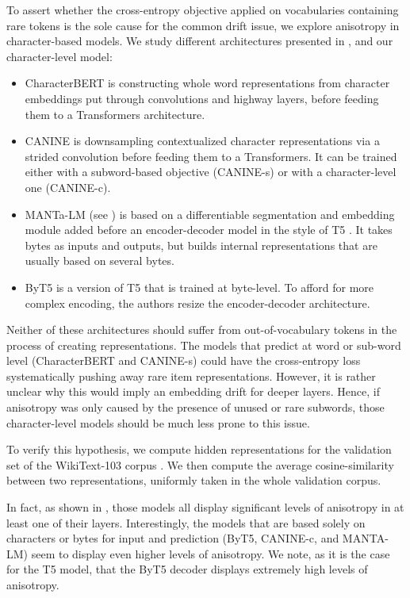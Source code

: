 To assert whether the cross-entropy objective applied on vocabularies containing rare tokens is the sole cause for the common drift issue, we explore anisotropy in character-based models. We study different architectures presented in , and our character-level model:
\begin{itemize}
    \item CharacterBERT \citep{el-boukkouri-etal-2020-characterbert} is constructing whole word representations from character embeddings put through convolutions and highway layers, before feeding them to a Transformers architecture.
    \item CANINE \citep{clark-etal-2022-canine} is downsampling contextualized character representations via a strided convolution before feeding them to a Transformers. It can be trained either with a subword-based objective (CANINE-s) or with a character-level one (CANINE-c).
    \item MANTa-LM (see ) is based on a differentiable segmentation and embedding module added before an encoder-decoder model in the style of T5 \citep{2020t5}. It takes bytes as inputs and outputs, but builds internal representations that are usually based on several bytes.
    \item ByT5 \citep{xue-etal-2022-byt5} is a version of T5 that is trained at byte-level. To afford for more complex encoding, the authors resize the encoder-decoder architecture.
\end{itemize}

Neither of these architectures should suffer from out-of-vocabulary tokens in the process of creating representations. The models that predict at word or sub-word level (CharacterBERT and CANINE-s) could have the cross-entropy loss systematically pushing away rare item representations. However, it is rather unclear why this would imply an embedding drift for deeper layers. Hence, if anisotropy was only caused by the presence of unused or rare subwords, those character-level models should be much less prone to this issue.

To verify this hypothesis, we compute hidden representations for the validation set of the WikiText-103 corpus \citep{merity2017pointer}. We then compute the average cosine-similarity between two representations, uniformly taken in the whole validation corpus.

In fact, as shown in , those models all display significant levels of anisotropy in at least one of their layers. Interestingly, the models that are based solely on characters or bytes for input and prediction (ByT5, CANINE-c, and MANTA-LM) seem to display even higher levels of anisotropy. We note, as it is the case for the T5 model, that the ByT5 decoder displays extremely high levels of anisotropy.

